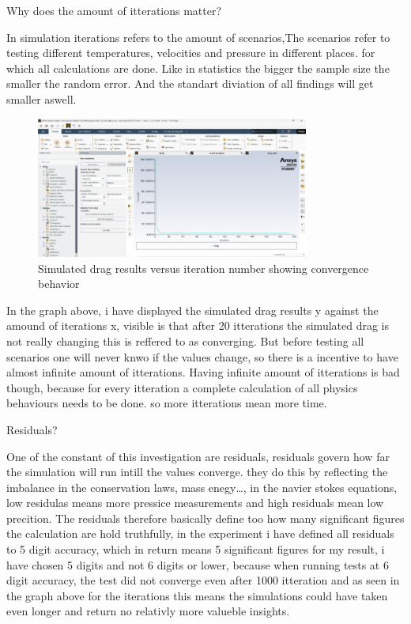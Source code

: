 \documentclass[12pt,a4paper]{article}
\begin{document}
Why does the amount of itterations matter?

In simulation iterations refers to the amount of scenarios,The scenarios refer to testing different temperatures, velocities and pressure in different places. for which all calculations are done. Like in statistics the bigger the sample size the smaller the random error. And the standart diviation of all findings will get smaller aswell. 

\begin{figure}[H]
    \centering
    \includegraphics[width=0.8\textwidth]{image8.png}
    \caption{Simulated drag results versus iteration number showing convergence behavior}
    \label{fig:convergence}
\end{figure}

In the graph above, i have displayed the simulated drag results y against the amound of iterations x, visible is that after 20 itterations the simulated drag is not really changing this is reffered to as converging. But before testing all scenarios one will never knwo if the values change, so there is a incentive to have almost infinite amount of itterations. Having infinite amount of itterations is bad though, because for every itteration a complete calculation of all physics behaviours needs to be done. so more itterations mean more time.

Residuals?

One of the constant of this investigation are residuals, residuals govern how far the simulation will run intill the values converge. they do this by reflecting the imbalance in the conservation laws, mass enegy…, in the navier stokes equations, low residulas means more pressice measurements and high residuals mean low precition. The residuals therefore basically define too how many significant figures the calculation are hold truthfully, in the experiment i have defined all residuals to 5 digit accuracy, which in return means 5 significant figures for my result, i have chosen 5 digits and not 6 digits or lower, because when running tests at 6 digit accuracy, the test did not converge even after 1000 itteration and as seen in the graph above for the iterations this means the simulations could have taken even longer and return no relativly more valueble insights. 
\end{document}
